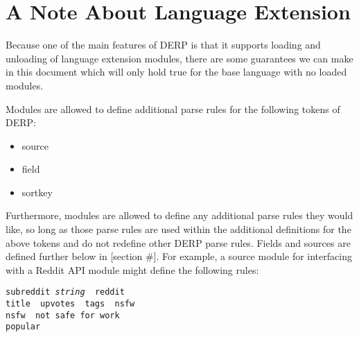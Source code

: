 \section{A Note About Language Extension}
Because one of the main features of DERP is that it supports loading and unloading
of language extension modules, there are some guarantees we can make in this document
which will only hold true for the base language with no loaded modules.

Modules are allowed to define additional parse rules for the following tokens of DERP:
\begin{itemize}
\item source
\item field
\item sortkey
\end{itemize}
Furthermore, modules are allowed to define any additional parse rules they would like, so
long as those parse rules are used within the additional definitions for the above tokens
and do not redefine other DERP parse rules. Fields and sources are defined further below in [section \#].
For example, a source module for interfacing with a Reddit API module might define the following rules:
\begin{description}[labelindent=1cm,leftmargin=\onelen,labelwidth=1cm]
     \texttt{subreddit \textit{string} \textbf{\textbar} reddit}\\
     \texttt{title \textbf{\textbar} upvotes \textbf{\textbar} tags \textbf{\textbar} nsfw}\\
     \texttt{nsfw \textbf{\textbar} not safe for work}\\
     \texttt{popular}\\
\end{description}
